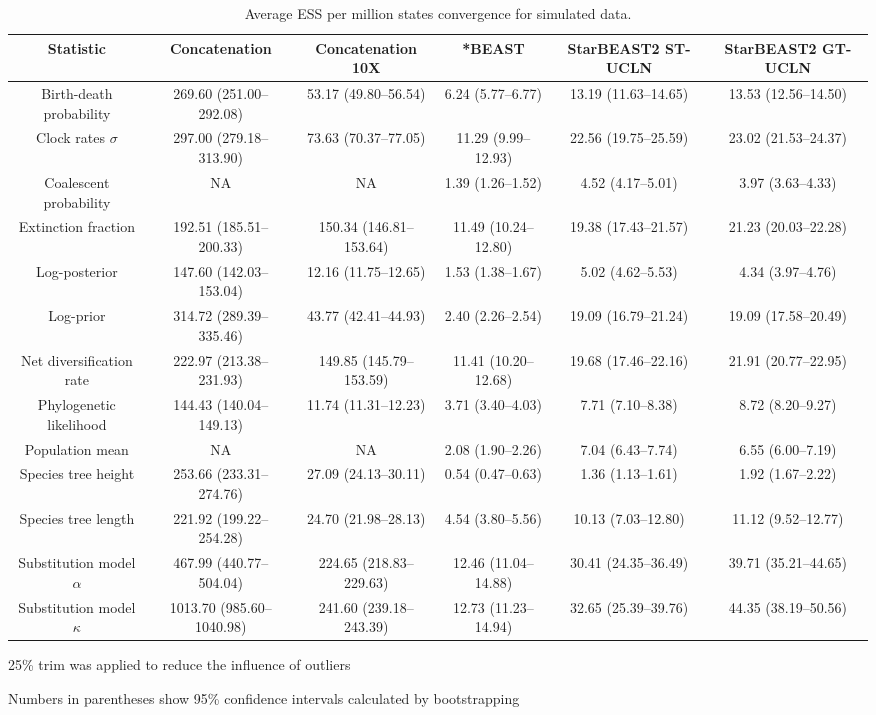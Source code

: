 \documentclass[12pt]{article}
\begin{document}
\begin{landscape}
\clearpage

\begin{table}[htb!]
\centering
\caption{Average ESS per million states convergence for simulated data.}
\label{tab:simulatedPerMstates}
\begin{threeparttable}
\begin{adjustbox}{center}
\renewcommand{\arraystretch}{1.2}
\footnotesize
\begin{tabular}{|c|c|c|c|c|c|}
\multicolumn{1}{c}{Statistic} & \multicolumn{1}{c}{Concatenation} & \multicolumn{1}{c}{Concatenation 10X} & \multicolumn{1}{c}{*BEAST} & \multicolumn{1}{c}{StarBEAST2 ST-UCLN} & \multicolumn{1}{c}{StarBEAST2 GT-UCLN}\tabularnewline
\hline
Birth-death probability & 269.60 (251.00--292.08) & 53.17 (49.80--56.54) & 6.24 (5.77--6.77) & 13.19 (11.63--14.65) & 13.53 (12.56--14.50)\tabularnewline
\hline
Clock rates $\sigma$ & 297.00 (279.18--313.90) & 73.63 (70.37--77.05) & 11.29 (9.99--12.93) & 22.56 (19.75--25.59) & 23.02 (21.53--24.37)\tabularnewline
\hline
Coalescent probability & NA & NA & 1.39 (1.26--1.52) & 4.52 (4.17--5.01) & 3.97 (3.63--4.33)\tabularnewline
\hline
Extinction fraction & 192.51 (185.51--200.33) & 150.34 (146.81--153.64) & 11.49 (10.24--12.80) & 19.38 (17.43--21.57) & 21.23 (20.03--22.28)\tabularnewline
\hline
Log-posterior & 147.60 (142.03--153.04) & 12.16 (11.75--12.65) & 1.53 (1.38--1.67) & 5.02 (4.62--5.53) & 4.34 (3.97--4.76)\tabularnewline
\hline
Log-prior & 314.72 (289.39--335.46) & 43.77 (42.41--44.93) & 2.40 (2.26--2.54) & 19.09 (16.79--21.24) & 19.09 (17.58--20.49)\tabularnewline
\hline
Net diversification rate & 222.97 (213.38--231.93) & 149.85 (145.79--153.59) & 11.41 (10.20--12.68) & 19.68 (17.46--22.16) & 21.91 (20.77--22.95)\tabularnewline
\hline
Phylogenetic likelihood & 144.43 (140.04--149.13) & 11.74 (11.31--12.23) & 3.71 (3.40--4.03) & 7.71 (7.10--8.38) & 8.72 (8.20--9.27)\tabularnewline
\hline
Population mean & NA & NA & 2.08 (1.90--2.26) & 7.04 (6.43--7.74) & 6.55 (6.00--7.19)\tabularnewline
\hline
Species tree height & 253.66 (233.31--274.76) & 27.09 (24.13--30.11) & 0.54 (0.47--0.63) & 1.36 (1.13--1.61) & 1.92 (1.67--2.22)\tabularnewline
\hline
Species tree length & 221.92 (199.22--254.28) & 24.70 (21.98--28.13) & 4.54 (3.80--5.56) & 10.13 (7.03--12.80) & 11.12 (9.52--12.77)\tabularnewline
\hline
Substitution model $\alpha$ & 467.99 (440.77--504.04) & 224.65 (218.83--229.63) & 12.46 (11.04--14.88) & 30.41 (24.35--36.49) & 39.71 (35.21--44.65)\tabularnewline
\hline
Substitution model $\kappa$ & 1013.70 (985.60--1040.98) & 241.60 (239.18--243.39) & 12.73 (11.23--14.94) & 32.65 (25.39--39.76) & 44.35 (38.19--50.56)\tabularnewline
\hline
\end{tabular}
\end{adjustbox}
\begin{tablenotes}
\footnotesize
\item 25\% trim was applied to reduce the influence of outliers
\item Numbers in parentheses show 95\% confidence intervals calculated by bootstrapping
\end{tablenotes}
\end{threeparttable}
\end{table}

\end{landscape}
\end{document}
